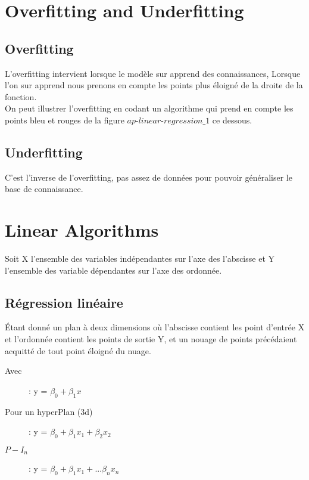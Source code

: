\chapter{Overfitting and Underfitting}
\section{Overfitting}
L'overfitting intervient lorsque le modèle sur apprend des connaissances,
Lorsque l'on sur apprend nous prenons en compte les points plus éloigné de la droite de la fonction.\\
On peut illustrer l'overfitting en codant un algorithme qui prend en compte les points bleu et rouges de la figure $\textit{ap-linear-regression\_1}$ ce dessous.\\

\section{Underfitting}
C'est l'inverse de l'overfitting, pas assez de données pour pouvoir généraliser le base de connaissance.\\
\pagebreak
\chapter{Linear Algorithms}

Soit X l'ensemble des variables indépendantes sur l'axe des l'abscisse et
Y l'ensemble des variable dépendantes sur l'axe des ordonnée.

\section{Régression linéaire}
Étant donné un plan à deux dimensions où l'abscisse contient les point d'entrée X et l'ordonnée contient les points de sortie Y, et un nouage de points précédaient acquitté de tout point éloigné du nuage.\\

\begin{description}
\item[Avec]: y  = $\beta_0 + \beta_1 x$
\item[Pour un hyperPlan (3d)]: y = $\beta_0 + \beta_1 x_1 + \beta_2 x_2$
\item[$P-I_n$]: y = $\beta_0 + \beta_1 x_1 + ... \beta_n x_n$
\end{description}

